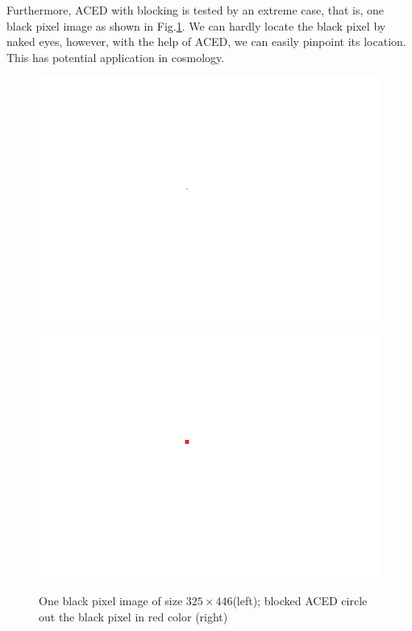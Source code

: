 \documentclass[letterpaper]{article}
\newcommand{\mypar}[1]{{\bf #1.}}
\begin{document}
Furthermore, ACED with blocking is tested by an extreme case, that is, one black pixel image as shown in Fig.\ref{fig:Oneblackpixel_ACED}. We can hardly locate the black pixel by naked eyes, however, with the help of ACED, we can easily pinpoint its location. This has potential application in cosmology.     
\begin{figure}\centering
	\includegraphics[width=0.3\columnwidth]{One_black_Pixel1.png}
	\includegraphics[width=0.3\columnwidth]{One_black_Pixel1_testb1.png}
	\caption{One black pixel image of size $325\times446$(left); blocked ACED circle out the black pixel in red color (right)}\label{fig:Oneblackpixel_ACED}
\end{figure} 
%
%
%
%
\end{document}
